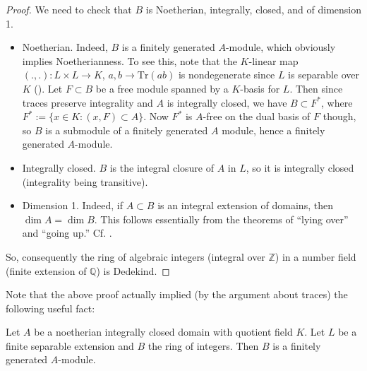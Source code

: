 \begin{proof}  We need to check that $B$ is Noetherian, integrally, closed, and of dimension 1.

\begin{itemize}
\item Noetherian.  Indeed, $B$ is a finitely generated $A$-module, which
obviously implies Noetherianness. To see this, note that the $K$-linear map
$(.,.): L \times L \to K$, $a,b \to \mathrm{Tr}(ab)$ is nondegenerate since
$L$ is separable over $K$ (\rref{}).  Let $F \subset B$ be a free module spanned by a $K$-basis for $L$.  Then since traces preserve integrality and $A$ is integrally closed, we have $B \subset F^*$, where $F^* := \{ x \in K: (x,F) \subset A \}$.  Now $F^*$ is $A$-free on the dual basis of $F$ though, so $B$ is a submodule of a finitely generated $A$ module, hence a finitely generated $A$-module.
\item Integrally closed.  $B$ is the integral closure of $A$ in $L$, so it
is integrally closed (integrality being transitive).
\item Dimension 1.  Indeed, if $A \subset B$ is an integral extension of
domains, then $\dim A = \dim B$. This follows essentially from the theorems of
``lying over'' and ``going up.'' Cf. \cite{Ei95}.
\end{itemize}

So, consequently the ring of algebraic integers (integral over $\mathbb{Z}$) in a number field (finite extension of $\mathbb{Q}$) is Dedekind.
\end{proof}



Note that the above proof actually implied (by the argument about traces) the following useful fact:
\begin{proposition}\label{intclosurefgen} Let $A$ be a noetherian integrally closed domain with quotient field $K$.  Let $L$ be a finite separable extension and $B$ the ring of integers. Then $B$ is a finitely generated $A$-module.
\end{proposition}

